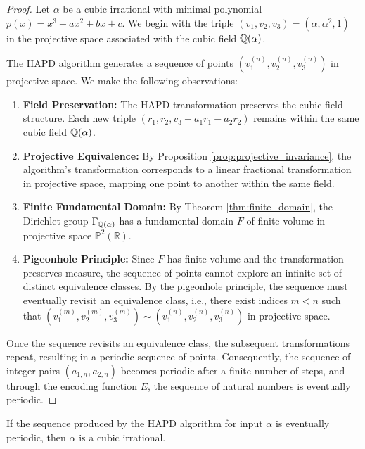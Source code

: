 \begin{proof}
Let $\alpha$ be a cubic irrational with minimal polynomial $p(x) = x^3 + ax^2 + bx + c$. We begin with the triple $(v_1, v_2, v_3) = (\alpha, \alpha^2, 1)$ in the projective space associated with the cubic field $\mathbb{Q}(\alpha)$.

The HAPD algorithm generates a sequence of points $(v_1^{(n)}, v_2^{(n)}, v_3^{(n)})$ in projective space. We make the following observations:

\begin{enumerate}
    \item \textbf{Field Preservation:} The HAPD transformation preserves the cubic field structure. Each new triple $(r_1, r_2, v_3 - a_1r_1 - a_2r_2)$ remains within the same cubic field $\mathbb{Q}(\alpha)$.
    
    \item \textbf{Projective Equivalence:} By Proposition \ref{prop:projective_invariance}, the algorithm's transformation corresponds to a linear fractional transformation in projective space, mapping one point to another within the same field.
    
    \item \textbf{Finite Fundamental Domain:} By Theorem \ref{thm:finite_domain}, the Dirichlet group $\Gamma_{\mathbb{Q}(\alpha)}$ has a fundamental domain $F$ of finite volume in projective space $\mathbb{P}^2(\mathbb{R})$.
    
    \item \textbf{Pigeonhole Principle:} Since $F$ has finite volume and the transformation preserves measure, the sequence of points cannot explore an infinite set of distinct equivalence classes. By the pigeonhole principle, the sequence must eventually revisit an equivalence class, i.e., there exist indices $m < n$ such that $(v_1^{(m)}, v_2^{(m)}, v_3^{(m)}) \sim (v_1^{(n)}, v_2^{(n)}, v_3^{(n)})$ in projective space.
\end{enumerate}

Once the sequence revisits an equivalence class, the subsequent transformations repeat, resulting in a periodic sequence of points. Consequently, the sequence of integer pairs $(a_{1,n}, a_{2,n})$ becomes periodic after a finite number of steps, and through the encoding function $E$, the sequence of natural numbers is eventually periodic.
\end{proof}

\begin{theorem}\label{thm:only_cubic_periodic}
If the sequence produced by the HAPD algorithm for input $\alpha$ is eventually periodic, then $\alpha$ is a cubic irrational.
\end{theorem}

